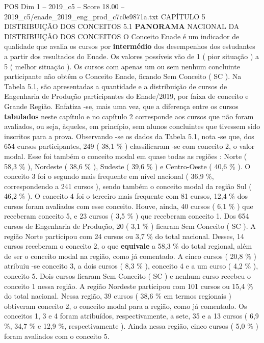 \begin{textsample}{POS Dim 1 – 2019\_c5 – Score 18.00 – 2019\_c5/enade\_2019\_eng\_prod\_c7c0e9871a.txt}  \label{ex:f1_pos_047}
CAPÍTULO 5 DISTRIBUIÇÃO DOS CONCEITOS 5.1 \textbf{PANORAMA} NACIONAL DA DISTRIBUIÇÃO DOS CONCEITOS O Conceito Enade é um indicador de qualidade que avalia os cursos por \textbf{intermédio} dos desempenhos dos estudantes a partir dos resultados do Enade.
Os valores possíveis vão de 1 ( pior situação ) a 5 ( melhor situação ).
Os cursos com apenas um ou sem nenhum concluinte participante não obtêm o Conceito Enade, ficando Sem Conceito ( SC ).
Na Tabela 5.1, são apresentadas a quantidade e a distribuição de cursos de Engenharia de Produção participantes do Enade/2019, por faixa de conceito e Grande Região.
Enfatiza -se, mais uma vez, que a diferença entre os cursos \textbf{tabulados} neste capítulo e no capítulo 2 corresponde aos cursos que não foram avaliados, ou seja, àqueles, em princípio, sem alunos concluintes que tivessem sido inscritos para a prova.
Observando -se os dados da Tabela 5.1, nota -se que, dos 654 cursos participantes, 249 ( 38,1 \% ) classificaram -se com conceito 2, o valor modal.
Esse foi também o conceito modal em quase todas as regiões : Norte ( 58,3 \% ), Nordeste ( 38,6 \% ), Sudeste ( 39,6 \% ) e Centro-Oeste ( 40,6 \% ).
O conceito 3 foi o segundo mais frequente em nível nacional ( 36,9 \%, correspondendo a 241 cursos ), sendo também o conceito modal da região Sul ( 46,2 \% ).
O conceito 4 foi o terceiro mais frequente com 81 cursos, 12,4 \% dos cursos foram avaliados com esse conceito.
Houve, ainda, 40 cursos ( 6,1 \% ) que receberam conceito 5, e 23 cursos ( 3,5 \% ) que receberam conceito 1.
Dos 654 cursos de Engenharia de Produção, 20 ( 3,1 \% ) ficaram Sem Conceito ( SC ).
A região Norte participou com 24 cursos ou 3,7 \% do total nacional.
Desses, 14 cursos receberam o conceito 2, o que \textbf{equivale} a 58,3 \% do total regional, além de ser o conceito modal na região, como já comentado.
A cinco cursos ( 20,8 \% ) atribuiu -se conceito 3, a dois cursos ( 8,3 \% ), conceito 4 e a um curso ( 4,2 \% ), conceito 5.
Dois cursos ficaram Sem Conceito ( SC ) e nenhum curso recebeu o conceito 1 nessa região.
A região Nordeste participou com 101 cursos ou 15,4 \% do total nacional.
Nessa região, 39 cursos ( 38,6 \% em termos regionais ) obtiveram conceito 2, o conceito modal para a região, como já comentado.
Os conceitos 1, 3 e 4 foram atribuídos, respectivamente, a sete, 35 e a 13 cursos ( 6,9 \%, 34,7 \% e 12,9 \%, respectivamente ).
Ainda nessa região, cinco cursos ( 5,0 \% ) foram avaliados com o conceito 5.

\end{textsample}
